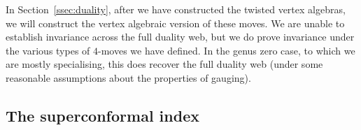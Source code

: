\documentclass[a4paper]{article}
\begin{document}
In Section~\ref{ssec:duality}, after we have constructed the twisted vertex algebras, we will construct the vertex algebraic version of these moves. We are unable to establish invariance across the full duality web, but we do prove invariance under the various types of $4$-moves we have defined. In the genus zero case, to which we are mostly specialising, this does recover the full duality web (under some reasonable assumptions about the properties of gauging).

\subsection{\label{ssec:twisted_background/index}The superconformal index}
\end{document}
